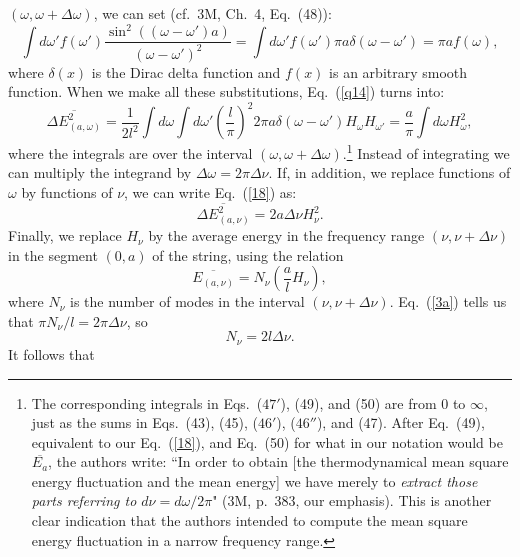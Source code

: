 \documentclass[12pt]{elsart}
\begin{document}
$(\omega, \omega + \Delta \omega)$, we can set (cf.\ 3M, Ch.\ 4, Eq.\ (48)):
\begin{equation}
\int d \omega' f(\omega') \frac{ \sin^2{((\omega - \omega')a)}}{(\omega - \omega')^2} = \int d\omega' f(\omega') \pi a \delta(\omega - \omega') = \pi a f(\omega),
\label{17}
\end{equation}
where $\delta(x)$ is the Dirac delta function and $f(x)$ is an arbitrary smooth function. 
When we make all these substitutions, Eq.\ (\ref{q14}) turns into:
\begin{equation}
\overline{\Delta E_{(a, \omega)}^2} = \frac{1}{2l^2} \int d\omega \int d\omega' \left( \frac{l}{\pi} \right)^2
2 \pi a \delta(\omega - \omega') H_\omega H_{\omega'} = \frac{a}{\pi} \int d\omega H^2_\omega,
\label{18}
\end{equation}
where the integrals are over the interval $(\omega, \omega + \Delta \omega)$.\footnote{The corresponding integrals in Eqs.\ ($47'$), (49), and (50) are from 0 to $\infty$, just as the sums in Eqs.\ (43), (45), ($46'$), ($46''$), and (47). After Eq.\ (49), equivalent to our Eq.\ (\ref{18}), and Eq.\ (50) for what in our notation would be $\overline{E_a}$, the authors write:  ``In order to obtain [the thermodynamical mean square energy fluctuation and the mean energy] we have merely to {\it extract those parts referring to $d \nu = d \omega/2 \pi$}" (3M, p.\ 383, our emphasis). This is another clear indication that the authors intended to compute the mean square energy fluctuation in a narrow frequency range.} Instead of integrating we can multiply the integrand by $\Delta \omega = 2 \pi \Delta \nu$. If, in addition, we replace functions of $\omega$ by functions of $\nu$, we can write Eq.\ (\ref{18}) as:
\begin{equation}
\overline{\Delta E_{(a, \nu)}^2} = 2a \Delta \nu H^2_\nu.
\label{18a}
\end{equation}
Finally, we replace $H_\nu$ by the average energy in the frequency range $(\nu, \nu + \Delta \nu)$ in the segment $(0,a)$ of the string, using the relation
\begin{equation}
\overline{E_{(a, \nu)}} = N_\nu \left( \frac{a}{l} H_\nu \right),
\label{19}
\end{equation}
where $N_\nu$ is the number of modes in the interval $(\nu, \nu + \Delta \nu)$. Eq.\ (\ref{3a}) tells us that $\pi N_\nu/l = 2 \pi \Delta \nu$, so
\begin{equation}
N_\nu = 2l \Delta \nu.
\label{20}
\end{equation}
It follows that 
\end{document}
